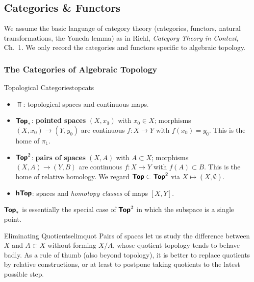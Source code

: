 \subsection{Categories \& Functors}

We assume the basic language of category theory (categories, functors, natural transformations, the Yoneda lemma) as in Riehl, \emph{Category Theory in Context}, Ch.~1. We only record the categories and functors specific to algebraic topology.


\subsubsection{The Categories of Algebraic Topology}

\begin{example}{Topological Categories}{topcats}
    \begin{itemize}
        \item $\Top$: topological spaces and continuous maps.
        \item $\bm{\mathsf{Top}}_*$: \textbf{pointed spaces} $(X,x_0)$ with $x_0\in X$; morphisms $(X,x_0)\to(Y,y_0)$ are continuous $f:X\to Y$ with $f(x_0)=y_0$. This is the home of $\pi_1$.
        \item $\bm{\mathsf{Top}}^{2}$: \textbf{pairs of spaces} $(X,A)$ with $A\subset X$; morphisms $(X,A)\to(Y,B)$ are continuous $f:X\to Y$ with $f(A)\subset B$. This is the home of relative homology. We regard $\bm{\mathsf{Top}}\subset\bm{\mathsf{Top}}^{2}$ via $X\mapsto(X,\emptyset)$.
        \item $\bm{\mathsf{hTop}}$: spaces and \emph{homotopy classes} of maps $[X,Y]$.
    \end{itemize}
    $\bm{\mathsf{Top}}_*$ is essentially the special case of $\bm{\mathsf{Top}}^{2}$ in which the subspace is a single point.
\end{example}

\begin{remark}{Eliminating Quotients}{elimquot}
    Pairs of spaces let us study the difference between $X$ and $A\subset X$ without forming $X/A$, whose quotient topology tends to behave badly. As a rule of thumb (also beyond topology), it is better to replace quotients by relative constructions, or at least to postpone taking quotients to the latest possible step.
\end{remark}

